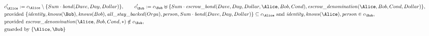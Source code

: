 \begin{align*}
&
c'_
{
\Alice
}
 := 
c_
{
\Alice
}
 \setminus 
\{
Sum
\cdot
\mathit{\detokenize{
bond
}}
(
Dave
,
Day
,
Dollar
)
\}
, \qquad 
c'_
{
\Bob
}
 := 
c_
{
\Bob
}
 \uplus 
\{
Sum
\cdot
\mathit{\detokenize{
escrow_bond
}}
(
Dave
,
Day
,
Dollar
,
\Alice
,
Bob
,
Cond
)
,
\mathit{\detokenize{
escrow_denomination
}}
(
\Alice
,
Bob
,
Cond
,
Dollar
)
\}
,\\
&
\text{provided } 
\{
\mathit{\detokenize{
identity
}}
,
\mathit{\detokenize{
knows
}}
(
\Bob
)
,
\mathit{\detokenize{
knows
}}
(
Bob
)
,
\mathit{\detokenize{
all_stay_backed
}}
(
Orga
)
,
\mathit{\detokenize{
person
}}
,
Sum
\cdot
\mathit{\detokenize{
bond
}}
(
Dave
,
Day
,
Dollar
)
\}
 \subseteq c_
{
\Alice
}
 \text{ and } 
\mathit{\detokenize{
identity
}}
,
\mathit{\detokenize{
knows
}}
(
\Alice
)
,
\mathit{\detokenize{
person
}}
 \in c_
{
\Bob
}
,\\
&
\text{provided } 
\mathit{\detokenize{
escrow_denomination
}}
(
\Alice
,
Bob
,
Cond
,
\ast
)
 \notin c_
{
\Bob
}
,\\
&
\text{guarded by } \{
\Alice
,
\Bob
\}
\end{align*}


